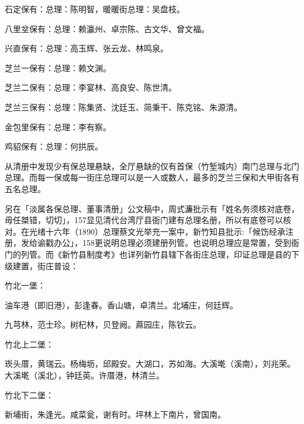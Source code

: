 石定保有：总理：陈明智，暖暖街总理：吴盘枝。

八里坌保有：总理：赖瀛州、卓宗陈、古文华、曾文福。

兴直保有：总理：高玉辉、张云龙、林鸣泉。


\noindent 芝兰一保有：总理：赖文渊。

芝兰二保有：总理：李宴林、高良安、陈世清。

芝兰三保有：总理：陈集贤、沈廷玉、简秉干、陈克铭、朱源清。

金包里保有：总理：李有察。

鸡貂保有：总理：何拱辰。

从清册中发现少有保总理悬缺，全厅悬缺的仅有首保（竹堑城内）南门总理与北门总理。而每一保或每一街庄总理可以是一人或数人，最多的芝兰三保和大甲街各有五名总理。

另在「淡属各保总理、董事清册」公文稿中，周式濂批示有「姓名务须核对底卷，毋任桀错，切切」，157显见清代台湾厅县衙门建有总理名册，所以有底卷可以核对。在光绪十六年（1890）总理蔡文光举充一案中，新竹知县批示:「候饬经承注册，发给谕戳办公」，158更说明总理必须建册列管。也说明总理应是常置，受到衙门的列管。而《新竹县制度考》也详列新竹县辖下各街庄总理，印证总理是县的下级建置，街庄普设：

竹北一堡：

\begin{BookQuote}
油车港（即旧港），彭逢春。香山塘，卓清兰。北埔庄，何廷辉。
\end{BookQuote}

\vfill
\begin{BookNotes}
\end{BookNotes}

\begin{BookQuote}
九芎林，范士珍。树杞林，贝登阙。蔴园庄，陈钦云。
\end{BookQuote}

竹北上二堡：

\begin{BookQuote}
崁头厝，黄瑞云。杨梅坜，邱殿安。大湖口，苏如海。大溪墘（溪南），刘兆荣。大溪墘（溪北），钟廷英。许厝港，林清兰。
\end{BookQuote}

竹北下二堡：

\begin{BookQuote}
新埔街，朱逢光。咸菜瓮，谢有时。坪林上下南片，曾国南。
\end{BookQuote}

